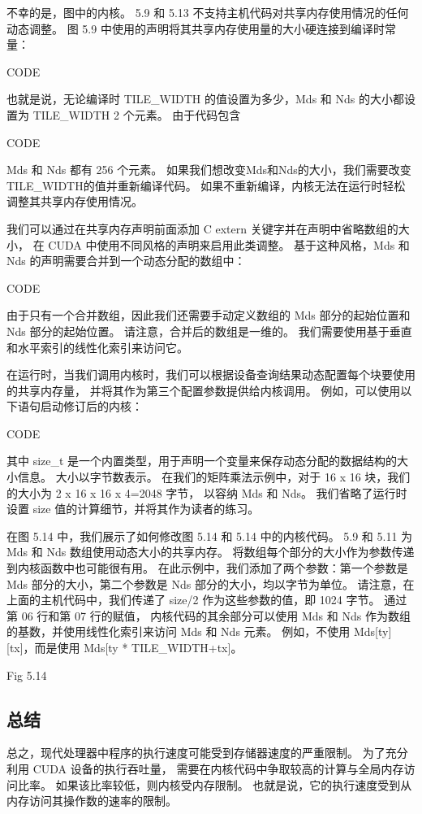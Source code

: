 不幸的是，图中的内核。 5.9 和 5.13 不支持主机代码对共享内存使用情况的任何动态调整。 
图 5.9 中使用的声明将其共享内存使用量的大小硬连接到编译时常量：

{\color{red} CODE}

也就是说，无论编译时 TILE\_WIDTH 的值设置为多少，Mds 和 Nds 的大小都设置为 TILE\_WIDTH 2 个元素。 由于代码包含

{\color{red} CODE}

Mds 和 Nds 都有 256 个元素。 如果我们想改变Mds和Nds的大小，我们需要改变TILE\_WIDTH的值并重新编译代码。 
如果不重新编译，内核无法在运行时轻松调整其共享内存使用情况。

我们可以通过在共享内存声明前面添加 C extern 关键字并在声明中省略数组的大小，
在 CUDA 中使用不同风格的声明来启用此类调整。 基于这种风格，Mds 和 Nds 的声明需要合并到一个动态分配的数组中：

{\color{red} CODE}

由于只有一个合并数组，因此我们还需要手动定义数组的 Mds 部分的起始位置和 Nds 部分的起始位置。 
请注意，合并后的数组是一维的。 我们需要使用基于垂直和水平索引的线性化索引来访问它。

在运行时，当我们调用内核时，我们可以根据设备查询结果动态配置每个块要使用的共享内存量，
并将其作为第三个配置参数提供给内核调用。 例如，可以使用以下语句启动修订后的内核：

{\color{red} CODE}

其中 size\_t 是一个内置类型，用于声明一个变量来保存动态分配的数据结构的大小信息。 
大小以字节数表示。 在我们的矩阵乘法示例中，对于 16 x 16 块，我们的大小为 2 x 16 x 16 x 4=2048 字节，
以容纳 Mds 和 Nds。 我们省略了运行时设置 size 值的计算细节，并将其作为读者的练习。

在图 5.14 中，我们展示了如何修改图 5.14 和 5.14 中的内核代码。 
5.9 和 5.11 为 Mds 和 Nds 数组使用动态大小的共享内存。 将数组每个部分的大小作为参数传递到内核函数中也可能很有用。 
在此示例中，我们添加了两个参数：第一个参数是 Mds 部分的大小，第二个参数是 Nds 部分的大小，均以字节为单位。 
请注意，在上面的主机代码中，我们传递了 size/2 作为这些参数的值，即 1024 字节。 通过第 06 行和第 07 行的赋值，
内核代码的其余部分可以使用 Mds 和 Nds 作为数组的基数，并使用线性化索引来访问 Mds 和 Nds 元素。 
例如，不使用 Mds[ty][tx]，而是使用 Mds[ty * TILE\_WIDTH+tx]。

{\color{red} Fig 5.14}

\subsection{总结}
总之，现代处理器中程序的执行速度可能受到存储器速度的严重限制。 为了充分利用 CUDA 设备的执行吞吐量，
需要在内核代码中争取较高的计算与全局内存访问比率。 如果该比率较低，则内核受内存限制。 
也就是说，它的执行速度受到从内存访问其操作数的速率的限制。

